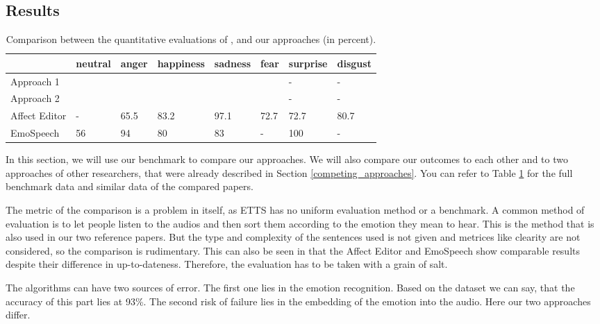 \documentclass[11pt]{article}
\begin{document}
\subsection{Results}
\begin{table}[t]

\centering
\vspace{5px}
{
\begin{tabular}{|p{2cm}|p{1.5cm}|p{1.5cm}|p{1.5cm}|p{1.5cm}|p{1.5cm}|p{1.5cm}|p{1.5cm}|}
\hline
\rowcolor{mintgreen}&neutral&anger&happiness&sadness&fear&surprise&disgust\\
\hline
\cellcolor{gainsboro}Approach 1&&&&&&-&-\\
\hline
\cellcolor{gainsboro}Approach 2&&&&&&-&-\\
\hline
\hline
\cellcolor{gainsboro}Affect Editor& -&65.5&83.2&97.1&72.7&72.7&80.7\\
\hline
\cellcolor{gainsboro}EmoSpeech&56 &94&80 &83&-&100&-\\
\hline
\end{tabular}
}

\caption{Comparison between the quantitative evaluations of \cite{cahn_generation_2000}, \cite{diatlova_emospeech_2023} and our approaches (in percent).}
\label{Tabelle}
\end{table}
In this section, we will use our benchmark to compare our approaches. We will also compare our outcomes to each other and to two approaches of other researchers, that were already described in Section \ref{competing_approaches}. You can refer to Table \ref{Tabelle} for the full benchmark data and similar data of the compared papers.

The metric of the comparison is a problem in itself, as ETTS has no uniform evaluation method or a benchmark. A common method of evaluation is to let people listen to the audios and then sort them according to the emotion they mean to hear. This is the method that is also used in our two reference papers. But the type and complexity of the sentences used is not given and metrices like clearity are not considered, so the comparison is rudimentary. This can also be seen in that the Affect Editor and EmoSpeech show comparable results despite their difference in up-to-dateness. Therefore, the evaluation has to be taken with a grain of salt.

The algorithms can have two sources of error. The first one lies in the emotion recognition. Based on the \cite{saravia-etal-2018-carer} dataset we can say, that the accuracy of this part lies at 93\%. The second risk of failure lies in the embedding of the emotion into the audio. Here our two approaches differ.
\end{document}
